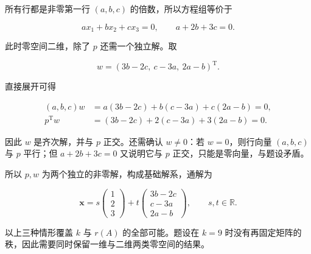 \documentclass[UTF8,11pt,fontset=windows]{ctexart}
\begin{document}
所有行都是非零第一行 $(a,b,c)$ 的倍数，所以方程组等价于

$$
ax_1+bx_2+cx_3=0,
\qquad a+2b+3c=0.
$$

此时零空间二维，除了 $p$ 还需一个独立解。取

$$
w=(3b-2c,\ c-3a,\ 2a-b)^{\mathrm T}.
$$

直接展开可得

$$
\begin{aligned}
(a,b,c)w
&=a(3b-2c)+b(c-3a)+c(2a-b)=0,\\
p^{\mathrm T}w
&=(3b-2c)+2(c-3a)+3(2a-b)=0.
\end{aligned}
$$

因此 $w$ 是齐次解，并与 $p$ 正交。还需确认 $w\ne0$：若 $w=0$，则行向量 $(a,b,c)$ 与 $p$ 平行；但 $a+2b+3c=0$ 又说明它与 $p$ 正交，只能是零向量，与题设矛盾。

所以 $p,w$ 为两个独立的非零解，构成基础解系，通解为

$$
\boxed{\boldsymbol x=s\begin{pmatrix}1\\2\\3\end{pmatrix}
+t\begin{pmatrix}3b-2c\\c-3a\\2a-b\end{pmatrix},\qquad s,t\in\mathbb R.}
$$

以上三种情形覆盖 $k$ 与 $r(A)$ 的全部可能。题设在 $k=9$ 时没有再固定矩阵的秩，因此需要同时保留一维与二维两类零空间的结果。
\end{document}
